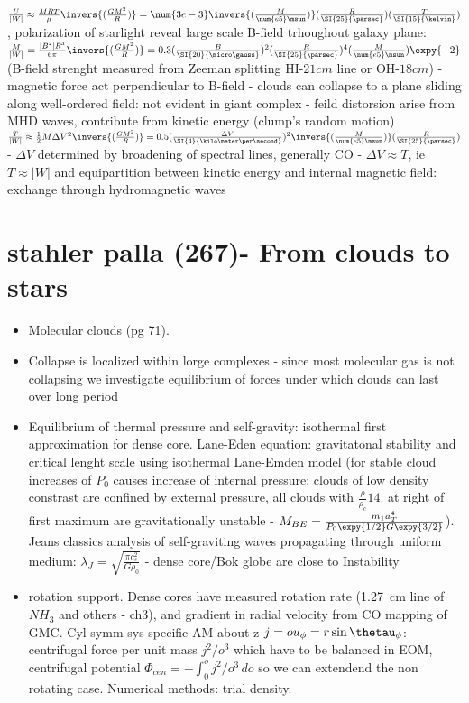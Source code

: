 \begin{itemize}
$\frac{U}{|W|}\approx\frac{MRT}{\mu}\invers{(\frac{GM^2}{R})}=\num{3e-3}\invers{(\frac{M}{\num{e5}\msun})}(\frac{R}{\SI{25}{\parsec}})(\frac{T}{\SI{15}{\kelvin}})$, polarization of starlight reveal large scale B-field trhoughout galaxy plane: $\frac{M}{|W|}=\frac{|B^2|R^3}{6\pi}\invers{(\frac{GM^2}{R})}=0.3(\frac{B}{\SI{20}{\micro\gauss}})^2(\frac{R}{\SI{25}{\parsec}})^4(\frac{M}{\num{e5}\msun})\expy{-2}$ (B-field strenght measured from Zeeman splitting HI-$21 cm$ line or OH-$18 cm$) - magnetic force act perpendicular to B-field - clouds can collapse to a plane sliding along well-ordered field: not evident in giant complex - feild distorsion arise from MHD waves, contribute from kinetic energy (clump's random motion) $\frac{T}{|W|}\approx\frac{1}{2}M\Delta V^2\invers{(\frac{GM^2}{R})}=0.5(\frac{\Delta V}{\SI{4}{\kilo\meter\per\second}})^2\invers{(\frac{M}{\num{e5}\msun})}(\frac{R}{\SI{25}{\parsec}})$ - $\Delta V$ determined by broadening of spectral lines, generally CO - $\Delta V\approx T$, ie $T\approx|W|$ and equipartition between kinetic energy and internal magnetic field: exchange through hydromagnetic waves
\end{itemize}

\chapter{stahler palla (267)- From clouds to stars}

\begin{itemize}
\item Molecular clouds (pg 71). 
\item Collapse is localized within lorge complexes - since most molecular gas is not collapsing we investigate equilibrium of forces under which clouds can last over long period
\item Equilibrium of thermal pressure and self-gravity: isothermal first approximation for dense core. Lane-Eden equation: gravitatonal stability and critical lenght scale using isothermal Lane-Emden model (for stable cloud increases of $P_0$ causes increase of internal pressure: clouds of low density constrast are confined by external pressure, all clouds with $\frac{\rho}{\rho_c}14.$ at right of first maximum are gravitationally unstable - $M_{BE}=\frac{m_1a_T^4}{P_0\expy{1/2}G\expy{3/2}}$). Jeans classics analysis of self-graviting waves propagating through uniform medium: $\lambda_J=\sqrt{\frac{\pi c_s^2}{G\rho_0}}$ - dense core/Bok globe are close to Instability
\item rotation support. Dense cores have measured rotation rate (\SI{1.27}{\cm} line of $NH_3$ and others - ch3), and gradient in radial velocity from CO mapping of GMC. Cyl symm-sys specific AM about z $j=ou_{\phi}=r\sin\thetau_{\phi}$: centrifugal force per unit mass $j^2/o^3$ which have to be balanced in EOM, centrifugal potential $\Phi_{cen}=-\int_0^oj^2/o^3\,do$ so we can extendend the non rotating case. Numerical methods: trial density. 
\end{itemize}